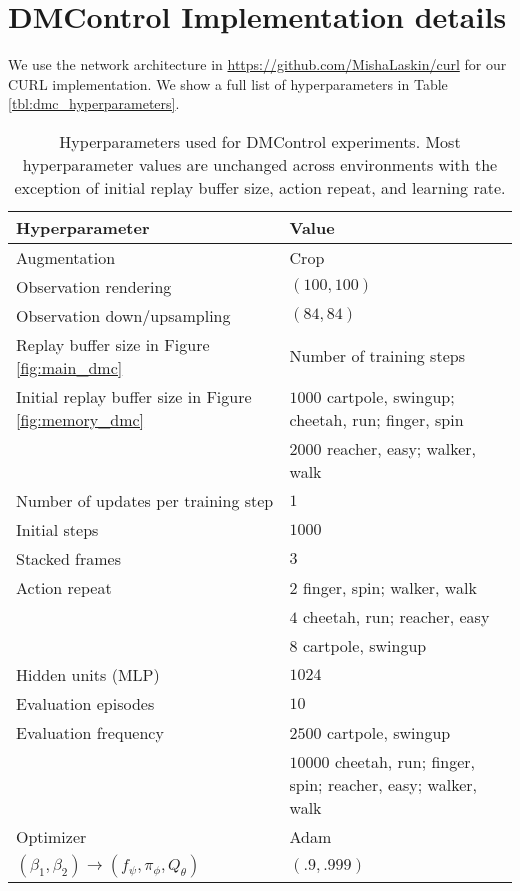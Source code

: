 \documentclass{article}
\begin{document}
\section{DMControl Implementation details} \label{appendix:dmc_implementation_details}
We use the network architecture in \url{https://github.com/MishaLaskin/curl} for our CURL \citep{srinivas2020curl} implementation. We show a full list of hyperparameters in Table \ref{tbl:dmc_hyperparameters}.

\begin{table*}[ht]
\caption{Hyperparameters used for DMControl experiments. Most hyperparameter values are unchanged across environments with the exception of initial replay buffer size, action repeat, and learning rate.}
\vskip 0.15in
\begin{center}
\begin{small}
\begin{tabular}{ll}
\toprule
\textbf{Hyperparameter} & \textbf{Value}  \\
\midrule
Augmentation    & Crop  \\ 
Observation rendering    & $(100,100)$  \\ 
Observation down/upsampling    & $(84,84)$ \\ 
Replay buffer size in Figure \ref{fig:main_dmc}   & Number of training steps \\ 
Initial replay buffer size in Figure \ref{fig:memory_dmc}  & $1000$ cartpole, swingup; cheetah, run; finger, spin \\
 & $2000$ reacher, easy; walker, walk \\
Number of updates per training step  & $1$ \\
Initial steps    & $1000$  \\ 
Stacked frames    & $3$  \\ 
Action repeat    & $2$ finger, spin; walker, walk\\
 & $4$ cheetah, run; reacher, easy  \\
 & $8$ cartpole, swingup \\
Hidden units (MLP)    & $1024$  \\ 
Evaluation episodes    & $10$  \\ 
Evaluation frequency    & $2500$ cartpole, swingup \\ 
 & $10000$ cheetah, run; finger, spin; reacher, easy; walker, walk \\
Optimizer    & Adam  \\ 
$(\beta_1,\beta_2) \rightarrow (f_\psi, \pi_\phi, Q_\theta)$   & $(.9,.999)$  \\

\end{tabular}
\end{small}
\end{center}
\end{table*}
\end{document}
